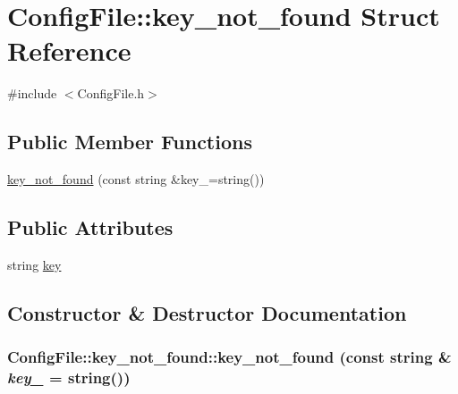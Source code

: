 \hypertarget{structConfigFile_1_1key__not__found}{
\section{ConfigFile::key\_\-not\_\-found Struct Reference}
\label{structConfigFile_1_1key__not__found}
}


{\ttfamily \#include $<$ConfigFile.h$>$}

\subsection*{Public Member Functions}
\begin{DoxyCompactItemize}
\item 
\hyperlink{structConfigFile_1_1key__not__found_aedacf2df70a4aa179448706b4862d768}{key\_\-not\_\-found} (const string \&key\_\-=string())
\end{DoxyCompactItemize}
\subsection*{Public Attributes}
\begin{DoxyCompactItemize}
\item 
string \hyperlink{structConfigFile_1_1key__not__found_a2872cbeb5ab860f357b3a58dd867b90b}{key}
\end{DoxyCompactItemize}


\subsection{Constructor \& Destructor Documentation}
\hypertarget{structConfigFile_1_1key__not__found_aedacf2df70a4aa179448706b4862d768}{
\subsubsection[{key\_\-not\_\-found}]{\setlength{\rightskip}{0pt plus 5cm}ConfigFile::key\_\-not\_\-found::key\_\-not\_\-found (const string \& {\em key\_\-} = {\ttfamily string()})}}
\label{structConfigFile_1_1key__not__found_aedacf2df70a4aa179448706b4862d768}


